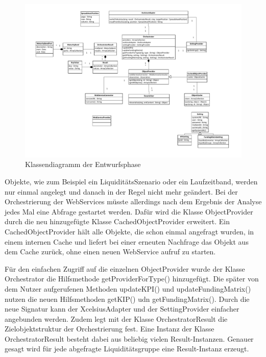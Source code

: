 
\begin{figure}[h]
\centering
\setlength{\unitlength}{1mm}
\includegraphics[width=15cm]{Visio/Entwurf.pdf}
\caption{Klassendiagramm der Entwurfsphase\label{fig:klassendiagramm_entwurf}}
\end{figure}

Objekte, wie zum Beispiel ein LiquiditätsSzenario oder ein Laufzeitband, werden nur einmal angelegt und danach in der Regel nicht mehr geändert. Bei der Orchestrierung der WebServices müsste allerdings nach dem Ergebnis der Analyse jedes Mal eine Abfrage gestartet werden. Dafür wird die Klasse ObjectProvider durch die neu hinzugefügte Klasse CachedObjectProvider erweitert. Ein CachedObjectProvider hält alle Objekte, die schon einmal angefragt wurden, in einem internen Cache und liefert bei einer erneuten Nachfrage das Objekt aus dem Cache zurück, ohne einen neuen WebService aufruf zu starten.

Für den einfachen Zugriff auf die einzelnen ObjectProvider wurde der Klasse Orchestrator die Hilfsmethode getProviderForType() hinzugefügt. Die später von dem Nutzer aufgerufenen Methoden updateKPI() und updateFundingMatrix() nutzen die neuen Hilfsmethoden getKIP() udn getFundingMatrix(). Durch die neue Signatur kann der XcelsiusAdapter und der SettingProvider einfacher angebunden werden.
Zudem legt mit der Klasse OrchestratorResult die Zielobjektstruktur der Orchestrierung fest. Eine Instanz der Klasse OrchestratorResult besteht dabei aus beliebig vielen Result-Instanzen. Genauer gesagt wird für jede abgefragte Liquiditätsgruppe eine Result-Instanz erzeugt.

